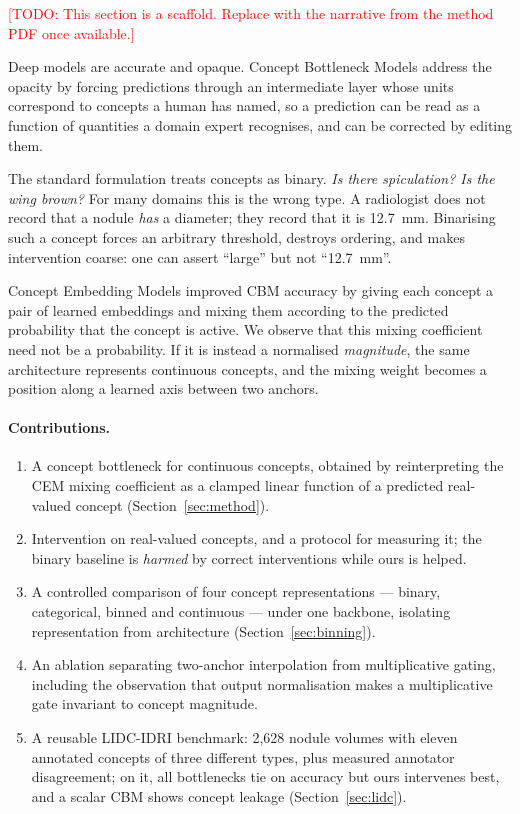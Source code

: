 \documentclass[11pt]{article}
\newcommand{\todo}[1]{\textcolor{red}{[TODO: #1]}}
\begin{document}
\todo{This section is a scaffold. Replace with the narrative from the method
PDF once available.}

Deep models are accurate and opaque. Concept Bottleneck Models
\citep{koh2020concept} address the opacity by forcing predictions through an
intermediate layer whose units correspond to concepts a human has named, so a
prediction can be read as a function of quantities a domain expert recognises,
and can be corrected by editing them.

The standard formulation treats concepts as binary. \emph{Is there spiculation?
Is the wing brown?} For many domains this is the wrong type. A radiologist does
not record that a nodule \emph{has} a diameter; they record that it is
\SI{12.7}{\milli\metre}. Binarising such a concept forces an arbitrary
threshold, destroys ordering, and makes intervention coarse: one can assert
``large'' but not ``\SI{12.7}{\milli\metre}''.

Concept Embedding Models \citep{zarlenga2022concept} improved CBM accuracy by
giving each concept a pair of learned embeddings and mixing them according to
the predicted probability that the concept is active. We observe that this
mixing coefficient need not be a probability. If it is instead a normalised
\emph{magnitude}, the same architecture represents continuous concepts, and the
mixing weight becomes a position along a learned axis between two anchors.

\paragraph{Contributions.}
\begin{enumerate}
  \item A concept bottleneck for continuous concepts, obtained by reinterpreting
        the CEM mixing coefficient as a clamped linear function of a predicted
        real-valued concept (Section~\ref{sec:method}).
  \item Intervention on real-valued concepts, and a protocol for measuring it;
        the binary baseline is \emph{harmed} by correct interventions while
        ours is helped.
  \item A controlled comparison of four concept representations --- binary,
        categorical, binned and continuous --- under one backbone, isolating
        representation from architecture (Section~\ref{sec:binning}).
  \item An ablation separating two-anchor interpolation from multiplicative
        gating, including the observation that output normalisation makes a
        multiplicative gate invariant to concept magnitude.
  \item A reusable LIDC-IDRI benchmark: 2{,}628 nodule volumes with eleven
        annotated concepts of three different types, plus measured annotator
        disagreement; on it, all bottlenecks tie on accuracy but ours
        intervenes best, and a scalar CBM shows concept leakage
        (Section~\ref{sec:lidc}).
\end{enumerate}
\end{document}
